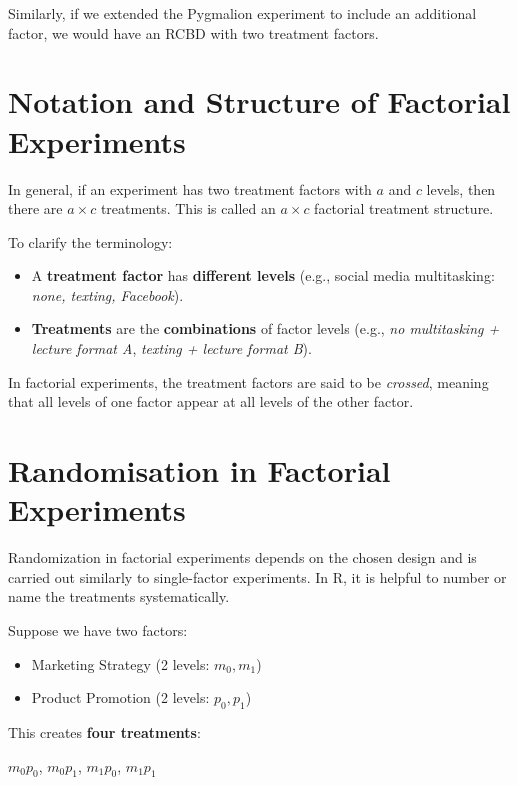 \documentclass[
  letterpaper,
]{book}
\providecommand{\tightlist}{%
  \setlength{\itemsep}{0pt}\setlength{\parskip}{0pt}}\usepackage{longtable,booktabs,array}
\begin{document}
Similarly, if we extended the Pygmalion experiment to include an
additional factor, we would have an RCBD with two treatment factors.

\section{Notation and Structure of Factorial
Experiments}\label{notation-and-structure-of-factorial-experiments}

In general, if an experiment has two treatment factors with \(a\) and
\(c\) levels, then there are \(a \times c\) treatments. This is called
an \(a \times c\) factorial treatment structure.

To clarify the terminology:

\begin{itemize}
\tightlist
\item
  A \textbf{treatment factor} has \textbf{different levels} (e.g.,
  social media multitasking: \emph{none, texting, Facebook}).
\item
  \textbf{Treatments} are the \textbf{combinations} of factor levels
  (e.g., \emph{no multitasking + lecture format A}, \emph{texting +
  lecture format B}).
\end{itemize}

In factorial experiments, the treatment factors are said to be
\emph{crossed}, meaning that all levels of one factor appear at all
levels of the other factor.

\section{Randomisation in Factorial
Experiments}\label{randomisation-in-factorial-experiments}

Randomization in factorial experiments depends on the chosen design and
is carried out similarly to single-factor experiments. In R, it is
helpful to number or name the treatments systematically.

Suppose we have two factors:

\begin{itemize}
\tightlist
\item
  Marketing Strategy (2 levels: \(m_0, m_1\))
\item
  Product Promotion (2 levels: \(p_0, p_1\))
\end{itemize}

This creates \textbf{four treatments}:

\(m_0p_0\), \(m_0p_1\), \(m_1p_0\), \(m_1p_1\)
\end{document}
